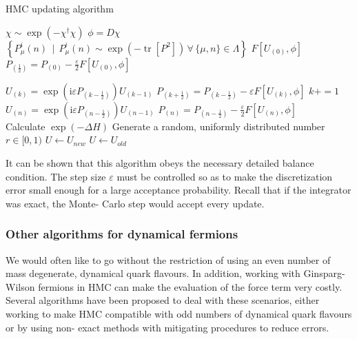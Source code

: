 \documentclass[a4paper,10pt]{article}
\begin{document}
\begin{algorithm}[H]
\caption{HMC updating algorithm}\label{alg:cap}
\begin{algorithmic}

\Ensure 
\State $\chi \sim \exp\left(- \chi^{\dagger} \chi  \right)$
\State $\phi = D\chi$
\State $\left\{P_{\mu}^{i}(n)\, \mid \, P_{\mu}^{i}(n)\sim \exp \left(-\operatorname{tr}\left[P^{2}\right]\right)\,\forall\,\{\mu,n\}\in \Lambda \right\}$
\State $F\left[ U_{(0)},\phi \right]$
\State $P_{\left(\frac{1}{2}\right)}=P_{(0)}-\frac{\varepsilon}{2}F\left[ U_{(0)},\phi \right]$

\State $U_{(k)}=\exp \left(\mathrm{i} \varepsilon P_{\left(k-\frac{1}{2}\right)}\right) U_{(k-1)}$
\State $P_{\left(k+\frac{1}{2}\right)}=P_{\left(k-\frac{1}{2}\right)}-\varepsilon F\left[ U_{(k)},\phi \right]$
\State $ k+=1$
\EndWhile
\State $U_{(n)}=\exp \left(\mathrm{i} \varepsilon P_{\left(n-\frac{1}{2}\right)}\right) U_{(n-1)}$
\State $P_{\left(n\right)}=P_{\left(n-\frac{1}{2}\right)}-\frac{\varepsilon}{2} F\left[ U_{(n)},\phi \right]$\\
\State Calculate $\exp (-\Delta H)$
\State Generate a random, uniformly distributed number $r \in [0,1) $
    \State $U \gets U_{new}$
\Else
    \State $U \gets U_{old}$
\EndIf

\end{algorithmic}
\end{algorithm}
It can be shown \cite{DUANE1987216} that this algorithm obeys the necessary detailed balance condition. The step size $\varepsilon$ must be controlled so as to make the discretization error small enough for a large acceptance probability. Recall that if the integrator was exact, the Monte- Carlo step would accept every update. 
\subsubsection{Other algorithms for dynamical fermions}
We would often like to go without the restriction of using an even number of mass degenerate, dynamical quark flavours. In addition, working with Ginsparg- Wilson fermions in HMC can make the evaluation of the force term very costly. Several algorithms have been proposed to deal with these scenarios, either working to make HMC compatible with odd numbers of dynamical quark flavours or by using non- exact methods with mitigating procedures to reduce errors.
\end{document}
